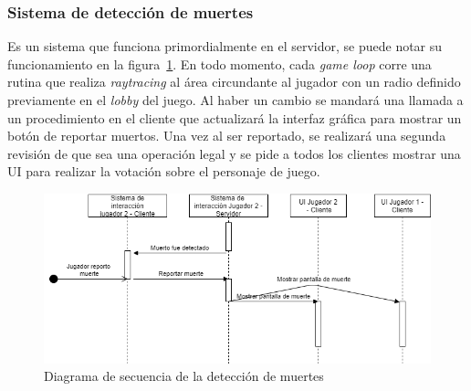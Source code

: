 \subsubsection{Sistema de detección de muertes}
Es un sistema que funciona primordialmente en el servidor, se puede notar su funcionamiento en la figura~\ref{fig:diagrama_sec_detect_muertes}. En todo momento, cada \textit{game loop} corre una rutina que realiza \textit{raytracing} al área circundante al jugador con un radio definido previamente en el \textit{lobby} del juego. Al haber un cambio se mandará una llamada a un procedimiento en el cliente que actualizará la interfaz gráfica para mostrar un botón de reportar muertos. Una vez al ser reportado, se realizará una segunda revisión de que sea una operación legal y se pide a todos los clientes mostrar una UI para realizar la votación sobre el personaje de juego.
\begin{figure}[h!]
    \centering
    \includegraphics[width=1\linewidth]{images/diagrama_deteccion_muerte.png}
    \caption{Diagrama de secuencia de la detección de muertes}
    \label{fig:diagrama_sec_detect_muertes}
\end{figure}

